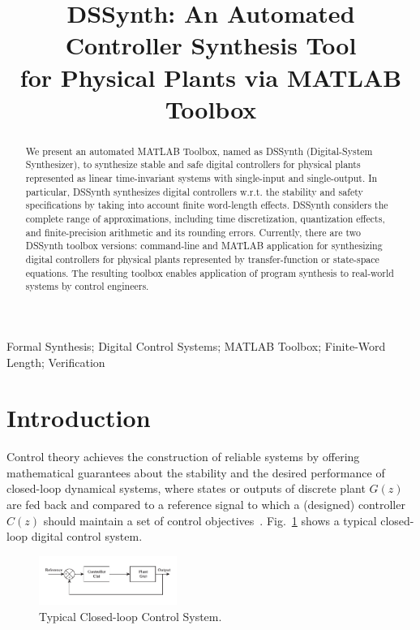 \documentclass[10pt,conference]{IEEEtran}
\begin{document}
\title{DSSynth: An Automated Controller Synthesis Tool \\ for Physical Plants via MATLAB Toolbox}


\maketitle

\begin{abstract}
We present an automated MATLAB Toolbox, named as DSSynth 
(Digital-System Synthesizer), to synthesize stable and safe digital controllers 
for physical plants represented as linear time-invariant
systems with single-input and single-output. In particular, DSSynth synthesizes digital 
controllers w.r.t. the stability and safety specifications by taking into account finite word-length 
effects. DSSynth considers the complete range
of approximations, including time discretization, quantization effects, 
and finite-precision arithmetic and its rounding errors. 
Currently, there are two DSSynth toolbox versions: command-line and 
MATLAB application for synthesizing digital controllers for physical plants 
represented by transfer-function or state-space equations. The resulting toolbox 
enables application of program synthesis to real-world systems by control engineers.
\end{abstract}

%
%
\begin{IEEEkeywords}
Formal Synthesis; Digital Control Systems; MATLAB Toolbox; Finite-Word Length; Verification
\end{IEEEkeywords}

\section{Introduction}

Control theory achieves the construction of reliable systems by 
offering mathematical guarantees about the stability and the desired 
performance of closed-loop dynamical systems, where states or outputs of discrete plant $G(z)$ 
are fed back and compared to a reference signal to which a (designed) 
controller $C(z)$ should maintain a set of control objectives~\cite{astrom1997computer}. 
Fig.~\ref{fig:typical-control-system} shows a typical closed-loop digital control system.
%
\begin{figure}[ht!]
\centering
\includegraphics[width=0.4\textwidth]{closedloopseries.pdf}
\caption{Typical Closed-loop Control System.}
\label{fig:typical-control-system}
\end{figure}
\end{document}
